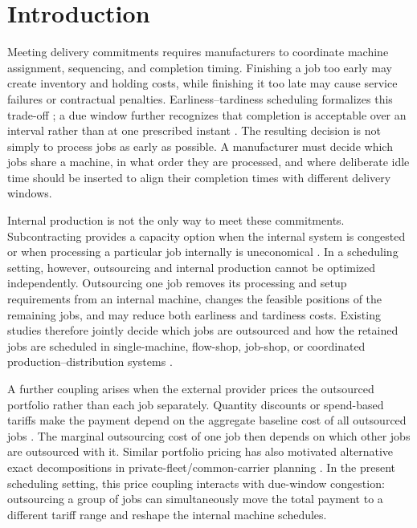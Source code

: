 \section{Introduction}\label{sec:introduction}

Meeting delivery commitments requires manufacturers to coordinate machine
assignment, sequencing, and completion timing. Finishing a job too early may
create inventory and holding costs, while finishing it too late may cause service
failures or contractual penalties. Earliness--tardiness scheduling formalizes
this trade-off \citep{baker1990review,kramer2019unified}; a due window further
recognizes that completion is acceptable over an interval rather than at one
prescribed instant \citep{wan2002tabu,rosa2017algorithms}. The resulting decision
is not simply to process jobs as early as possible. A manufacturer must decide
which jobs share a machine, in what order they are processed, and where deliberate
idle time should be inserted to align their completion times with different
delivery windows.

Internal production is not the only way to meet these commitments. Subcontracting
provides a capacity option when the internal system is congested or when processing
a particular job internally is uneconomical \citep{vanmieghem1999subcontracting}.
In a scheduling setting, however, outsourcing and internal production cannot be
optimized independently. Outsourcing one job removes its processing and setup
requirements from an internal machine, changes the feasible positions of the
remaining jobs, and may reduce both earliness and tardiness costs. Existing studies
therefore jointly decide which jobs are outsourced and how the retained jobs are
scheduled in single-machine, flow-shop, job-shop, or coordinated
production--distribution systems
\citep{lee2008outsourcing,safarzadeh2019jobshop,kim2022flowshop,zhong2022coordinated}.

A further coupling arises when the external provider prices the outsourced
portfolio rather than each job separately. Quantity discounts or spend-based
tariffs make the payment depend on the aggregate baseline cost of all outsourced
jobs \citep{lu2021discount}. The marginal outsourcing cost of one job then depends
on which other jobs are outsourced with it. Similar portfolio pricing has also
motivated alternative exact decompositions in private-fleet/common-carrier
planning \citep{dabia2019rich}. In the present scheduling setting, this price
coupling interacts with due-window congestion: outsourcing a group of jobs can
simultaneously move the total payment to a different tariff range and reshape the
internal machine schedules.

